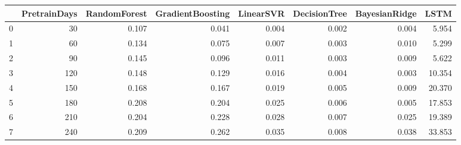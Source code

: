 \begin{tabular}{lrrrrrrr}
\toprule
{} &  PretrainDays &  RandomForest &  GradientBoosting &  LinearSVR &  DecisionTree &  BayesianRidge &   LSTM \\
\midrule
0 &            30 &         0.107 &             0.041 &      0.004 &         0.002 &          0.004 &  5.954 \\
1 &            60 &         0.134 &             0.075 &      0.007 &         0.003 &          0.010 &  5.299 \\
2 &            90 &         0.145 &             0.096 &      0.011 &         0.003 &          0.009 &  5.622 \\
3 &           120 &         0.148 &             0.129 &      0.016 &         0.004 &          0.003 & 10.354 \\
4 &           150 &         0.168 &             0.167 &      0.019 &         0.005 &          0.009 & 20.370 \\
5 &           180 &         0.208 &             0.204 &      0.025 &         0.006 &          0.005 & 17.853 \\
6 &           210 &         0.204 &             0.228 &      0.028 &         0.007 &          0.025 & 19.389 \\
7 &           240 &         0.209 &             0.262 &      0.035 &         0.008 &          0.038 & 33.853 \\
\bottomrule
\end{tabular}
